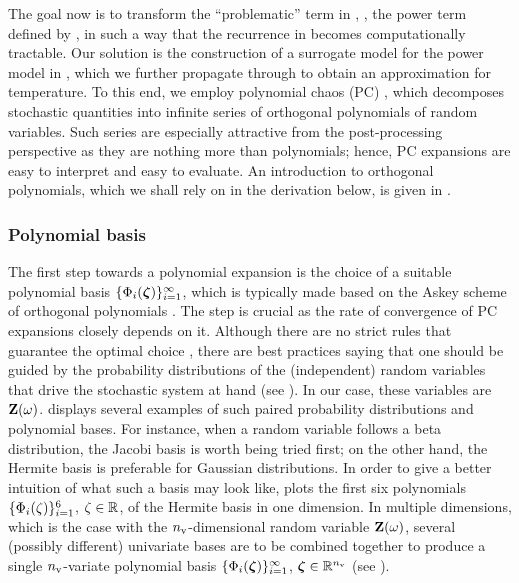 The goal now is to transform the ``problematic'' term in , \ie, the power term defined by , in such a way that the recurrence in  becomes computationally tractable.
Our solution is the construction of a surrogate model for the power model in , which we further propagate through  to obtain an approximation for temperature.
To this end, we employ polynomial chaos (PC) \cite{xiu2010}, which decomposes stochastic quantities into infinite series of orthogonal polynomials of random variables.
Such series are especially attractive from the post-processing perspective as they are nothing more than polynomials; hence, PC expansions are easy to interpret and easy to evaluate.
An introduction to orthogonal polynomials, which we shall rely on in the derivation below, is given in .



\subsubsection{Polynomial basis}
The first step towards a polynomial expansion is the choice of a suitable polynomial basis $\{ \Phi_i(\boldsymbol{\zeta}) \}_{i = 1}^\infty$, which is typically made based on the Askey scheme of orthogonal polynomials \cite{xiu2010}.
The step is crucial as the rate of convergence of PC expansions closely depends on it.
Although there are no strict rules that guarantee the optimal choice \cite{maitre2010, knio2006}, there are best practices saying that one should be guided by the probability distributions of the (independent) random variables that drive the stochastic system at hand (see ).
In our case, these variables are $\mathbf{Z}(\omega)$.
 displays several examples of such paired probability distributions and polynomial bases.
For instance, when a random variable follows a beta distribution, the Jacobi basis is worth being tried first; on the other hand, the Hermite basis is preferable for Gaussian distributions.
In order to give a better intuition of what such a basis may look like,  plots the first six polynomials $\{ \Phi_i(\zeta) \}_{i = 1}^6$, $\zeta \in \mathbb{R}$, of the Hermite basis in one dimension.
In multiple dimensions, which is the case with the ${n_\text{v}}$-dimensional random variable $\mathbf{Z}(\omega)$, several (possibly different) univariate bases are to be combined together to produce a single ${n_\text{v}}$-variate polynomial basis $\{ \Phi_i(\boldsymbol{\zeta}) \}_{i = 1}^\infty$, $\boldsymbol{\zeta} \in \mathbb{R}^{n_\text{v}}$ (see \cite{xiu2010, maitre2010}).


